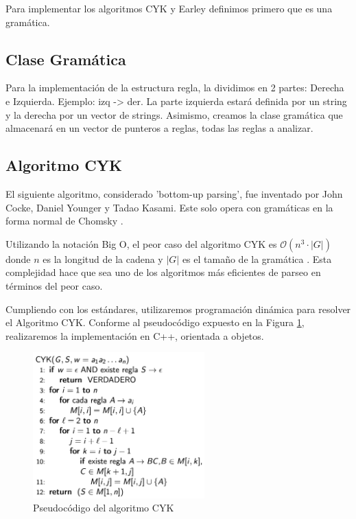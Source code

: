 \documentclass[12pt]{article}
\begin{document}
Para implementar los algoritmos CYK y Earley definimos primero que es una gramática.

\subsection{Clase Gramática}
Para la implementación de la estructura regla, la dividimos en 2 partes: Derecha e Izquierda. Ejemplo: izq -> der. La parte izquierda estará definida por un string y la derecha por un vector de strings. Asimismo, creamos la clase gramática que almacenará en un vector de punteros a reglas, todas las reglas a analizar.


%
\newpage


\subsection{Algoritmo CYK}
El siguiente algoritmo, considerado 'bottom-up parsing', fue inventado por John Cocke, Daniel Younger y Tadao Kasami. Este solo opera con gramáticas en la forma normal de Chomsky \cite{CYKAlgorithmWiki}. 

Utilizando la notación Big O, el peor caso del algoritmo CYK es  
 ${\displaystyle {\mathcal {O}}\left(n^{3}\cdot \left|G\right|\right)}$ donde ${\displaystyle n}$ es la longitud de la cadena y ${\displaystyle \left|G\right|}$ es el tamaño de la gramática \cite{HopcroftUllman}. Esta complejidad hace que sea uno de los algoritmos más eficientes de parseo en términos del peor caso.

Cumpliendo con los estándares, utilizaremos programación dinámica para resolver el Algoritmo CYK. Conforme al pseudocódigo expuesto en la Figura \ref{fig:pCYK}, realizaremos la implementación en C++, orientada a objetos.

\begin{figure}[h!]
    \centering
    \includegraphics[width=250px]{img/pCYK.png}
    \caption{Pseudocódigo del algoritmo CYK}
    \label{fig:pCYK}
\end{figure} 
\end{document}
